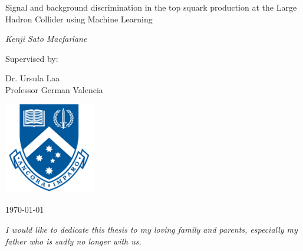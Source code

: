 \documentclass[12pt,a4paper]{report}
\begin{document}
\begin{titlepage}


				\centering
				
				
				{\huge{}\selectfont Signal and background discrimination in the top squark production at the Large Hadron Collider using Machine Learning \par}
				\vspace{1.0cm}
				\vspace{1cm}
				{\Large\itshape Kenji Sato Macfarlane\par}
				\vfill
				Supervised by:\par
				Dr. Ursula Laa \\ Professor German Valencia 
				
				\vfill
				\includegraphics[width=0.3\textwidth]{monashlogo.png}\par\vspace{1cm}
				
				{\large \today\par}

\end{titlepage}
\setcounter{page}{1}

\begin{center}
    \textit{I would like to dedicate this thesis to my loving family and parents, especially my father who is sadly no longer with us.}
\end{center}
\clearpage
\end{document}
